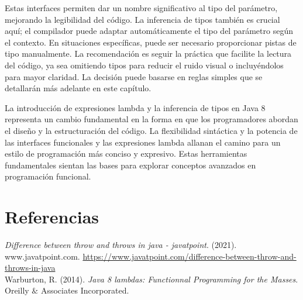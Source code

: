 \documentclass[12pt]{article}
\begin{document}
\begin{enumerate}
    Estas interfaces permiten dar un nombre significativo al tipo del parámetro, mejorando la legibilidad del código. La inferencia de tipos también es crucial aquí; el compilador puede adaptar automáticamente el tipo del parámetro según el contexto. En situaciones específicas, puede ser necesario proporcionar pistas de tipo manualmente. La recomendación es seguir la práctica que facilite la lectura del código, ya sea omitiendo tipos para reducir el ruido visual o incluyéndolos para mayor claridad. La decisión puede basarse en reglas simples que se detallarán más adelante en este capítulo.

    La introducción de expresiones lambda y la inferencia de tipos en Java 8 representa un cambio fundamental en la forma en que los programadores abordan el diseño y la estructuración del código. La flexibilidad sintáctica y la potencia de las interfaces funcionales y las expresiones lambda allanan el camino para un estilo de programación más conciso y expresivo. Estas herramientas fundamentales sientan las bases para explorar conceptos avanzados en programación funcional.
  \end{enumerate}

  \section*{Referencias}
  \textit{Difference between throw and throws in java - javatpoint}. (2021). www.javatpoint.com. \url{https://www.javatpoint.com/difference-between-throw-and-throws-in-java} \\

  Warburton, R. (2014). \textit{Java 8 lambdas: Functionnal Programming for the Masses}. Oreilly $\&$ Associates Incorporated.
\end{document}
